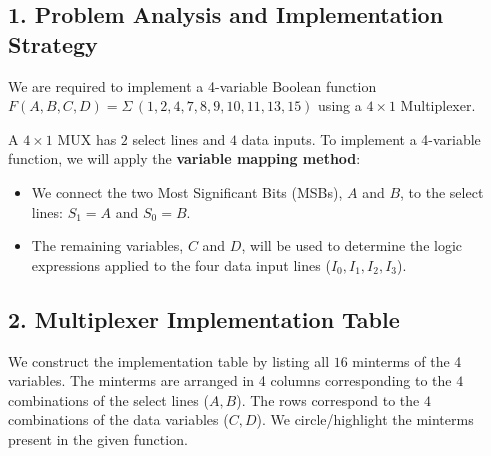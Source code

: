 \documentclass[12pt,a3paper]{article}
\begin{document}
\begin{enumerate}
\begin{tcolorbox}[enhanced,breakable,ansbox,colback=cD!4,colframe=cD,boxrule=0.8pt,arc=5pt,title={\textbf{Answer}},fonttitle=\bfseries\color{white},colbacktitle=cD]
\subsection*{1. Problem Analysis and Implementation Strategy}
We are required to implement a 4-variable Boolean function $F(A, B, C, D) = \Sigma\,(1, 2, 4, 7, 8, 9, 10, 11, 13, 15)$ using a $4 \times 1$ Multiplexer. 

A $4 \times 1$ MUX has $2$ select lines and $4$ data inputs. To implement a 4-variable function, we will apply the \textbf{variable mapping method}:
\begin{itemize}
    \item We connect the two Most Significant Bits (MSBs), $A$ and $B$, to the select lines: $S_1 = A$ and $S_0 = B$.
    \item The remaining variables, $C$ and $D$, will be used to determine the logic expressions applied to the four data input lines ($I_0, I_1, I_2, I_3$).
\end{itemize}

\vspace{0.2cm}
\subsection*{2. Multiplexer Implementation Table}
We construct the implementation table by listing all $16$ minterms of the 4 variables. The minterms are arranged in 4 columns corresponding to the $4$ combinations of the select lines ($A, B$). The rows correspond to the $4$ combinations of the data variables ($C, D$). We circle/highlight the minterms present in the given function.


\end{tcolorbox}
\end{enumerate}
\end{document}
